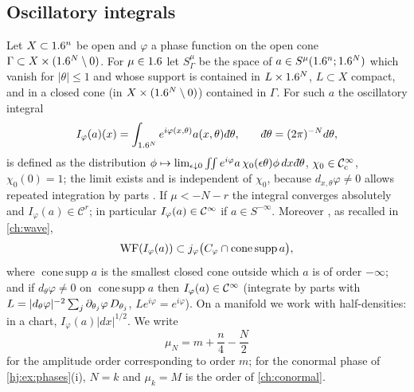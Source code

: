 \subsection{Oscillatory integrals}
Let $X\subset1.6^n$ be open and $\varphi$ a phase function on the open cone
$\Gamma\subset X\times(1.6^N\setminus0)$.  For $\mu\in1.6$ let $S^\mu_\Gamma$ be
the space of $a\in S^\mu(1.6^n;1.6^N)$ which vanish for $|\theta|\le1$ and whose
support is contained in $L\times1.6^N$, $L\subset X$ compact, and in a closed
cone (in $X\times(1.6^N\setminus0)$) contained in $\Gamma$.  For such $a$ the
oscillatory integral
\begin{equation*}
  I_\varphi(a)(x)=\int_{\R^N}e^{i\varphi(x,\theta)}a(x,\theta)\,\dbar\theta,\qquad
  \dbar\theta=(2\pi)^{-N}d\theta,
\end{equation*}
is defined as the distribution $\phi\mapsto\lim_{\epsilon\downarrow0}\iint
e^{i\varphi}a\,\chi_0(\epsilon\theta)\phi\,dx\,\dbar\theta$, $\chi_0\in\mathcal{C}^\infty_{\mathrm{c}}$,
$\chi_0(0)=1$; the limit exists and is independent of $\chi_0$, because
$d_{x,\theta}\varphi\neq0$ allows repeated integration by parts
\cite[Section~7.8]{Hormander-I}.  If $\mu<-N-r$ the integral converges
absolutely and $I_\varphi(a)\in\mathcal C^r$; in particular $I_\varphi(a)\in\mathcal{C}^\infty$
if $a\in S^{-\infty}$.  Moreover \cite[Section~8.1]{Hormander-I}, as recalled
in \cref{ch:wave},
\begin{equation}\label{hj:eq:WF-osc}
  \operatorname{WF}(I_\varphi(a))\subset j_\varphi\big(C_\varphi\cap\operatorname{cone\,supp}a\big),
\end{equation}
where $\operatorname{cone\,supp}a$ is the smallest closed cone outside which $a$
is of order $-\infty$; and if $d_\theta\varphi\ne0$ on $\operatorname{cone\,supp}a$
then $I_\varphi(a)\in\mathcal{C}^\infty$ (integrate by parts with $L=|d_\theta\varphi|^{-2}
\sum_j\partial_{\theta_j}\varphi\,D_{\theta_j}$, $Le^{i\varphi}=e^{i\varphi}$).  On a
manifold we work with half-densities: in a chart, $I_\varphi(a)|dx|^{1/2}$.  We
write
\begin{equation*}
  \mu_N=m+\frac n4-\frac N2
\end{equation*}
for the amplitude order corresponding to order $m$; for the conormal phase of
\cref{hj:ex:phases}(i), $N=k$ and $\mu_k=M$ is the order of \cref{ch:conormal}.

